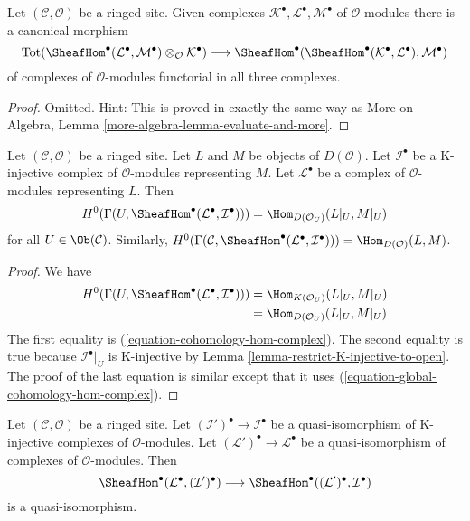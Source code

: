 \begin{lemma}
\label{lemma-evaluate-and-more}
Let $(\mathcal{C}, \mathcal{O})$ be a ringed site. Given complexes
$\mathcal{K}^\bullet, \mathcal{L}^\bullet, \mathcal{M}^\bullet$
of $\mathcal{O}$-modules there is a canonical morphism
$$
\text{Tot}(\SheafHom^\bullet(\mathcal{L}^\bullet,
\mathcal{M}^\bullet) \otimes_\mathcal{O} \mathcal{K}^\bullet)
\longrightarrow
\SheafHom^\bullet(\SheafHom^\bullet(\mathcal{K}^\bullet,
\mathcal{L}^\bullet), \mathcal{M}^\bullet)
$$
of complexes of $\mathcal{O}$-modules functorial in all three complexes.
\end{lemma}

\begin{proof}
Omitted. Hint: This is proved in exactly the same way as
More on Algebra, Lemma \ref{more-algebra-lemma-evaluate-and-more}.
\end{proof}

\begin{lemma}
\label{lemma-RHom-into-K-injective}
Let $(\mathcal{C}, \mathcal{O})$ be a ringed site. Let $L$ and $M$
be objects of $D(\mathcal{O})$. Let $\mathcal{I}^\bullet$
be a K-injective complex of $\mathcal{O}$-modules representing $M$. Let
$\mathcal{L}^\bullet$ be a complex of $\mathcal{O}$-modules
representing $L$.
Then
$$
H^0(\Gamma(U, \SheafHom^\bullet(\mathcal{L}^\bullet, \mathcal{I}^\bullet))) =
\Hom_{D(\mathcal{O}_U)}(L|_U, M|_U)
$$
for all $U \in \Ob(\mathcal{C})$. Similarly,
$H^0(\Gamma(\mathcal{C},
\SheafHom^\bullet(\mathcal{L}^\bullet, \mathcal{I}^\bullet))) =
\Hom_{D(\mathcal{O})}(L, M)$.
\end{lemma}

\begin{proof}
We have
\begin{align*}
H^0(\Gamma(U, \SheafHom^\bullet(\mathcal{L}^\bullet, \mathcal{I}^\bullet)))
& =
\Hom_{K(\mathcal{O}_U)}(L|_U, M|_U) \\
& =
\Hom_{D(\mathcal{O}_U)}(L|_U, M|_U)
\end{align*}
The first equality is (\ref{equation-cohomology-hom-complex}).
The second equality is true because $\mathcal{I}^\bullet|_U$
is K-injective by Lemma \ref{lemma-restrict-K-injective-to-open}.
The proof of the last equation is similar except that it uses
(\ref{equation-global-cohomology-hom-complex}).
\end{proof}

\begin{lemma}
\label{lemma-RHom-well-defined}
Let $(\mathcal{C}, \mathcal{O})$ be a ringed site. Let
$(\mathcal{I}')^\bullet \to \mathcal{I}^\bullet$
be a quasi-isomorphism of K-injective complexes of $\mathcal{O}$-modules.
Let $(\mathcal{L}')^\bullet \to \mathcal{L}^\bullet$
be a quasi-isomorphism of complexes of $\mathcal{O}$-modules.
Then
$$
\SheafHom^\bullet(\mathcal{L}^\bullet, (\mathcal{I}')^\bullet)
\longrightarrow
\SheafHom^\bullet((\mathcal{L}')^\bullet, \mathcal{I}^\bullet)
$$
is a quasi-isomorphism.
\end{lemma}

